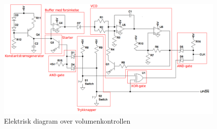 
\begin{figure}[h]
\centering
\includegraphics[width=\textwidth]{teknisk/volumenkontrol/diagram-med-kasser.png}
\caption{Elektrisk diagram over volumenkontrollen}
\label{fig:volumenkontrol_diagram}
\end{figure}

